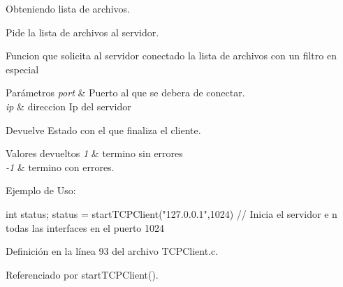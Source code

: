 Obteniendo lista de archivos. 

Pide la lista de archivos al servidor.

Funcion que solicita al servidor conectado la lista de archivos con un filtro en especial


\begin{DoxyParams}{Parámetros}
{\em port} & Puerto al que se debera de conectar. \\
\hline
{\em ip} & direccion Ip del servidor\\
\hline
\end{DoxyParams}
\begin{DoxyReturn}{Devuelve}
Estado con el que finaliza el cliente. 
\end{DoxyReturn}

\begin{DoxyRetVals}{Valores devueltos}
{\em 1} & termino sin errores \\
\hline
{\em -\/1} & termino con errores.\\
\hline
\end{DoxyRetVals}
Ejemplo de Uso: 
\begin{DoxyCode}
                int status;
                status = startTCPClient("127.0.0.1",1024) // Inicia el servidor e
      n todas las interfaces en el puerto 1024
\end{DoxyCode}
 

Definición en la línea 93 del archivo TCPClient.c.



Referenciado por startTCPClient().


